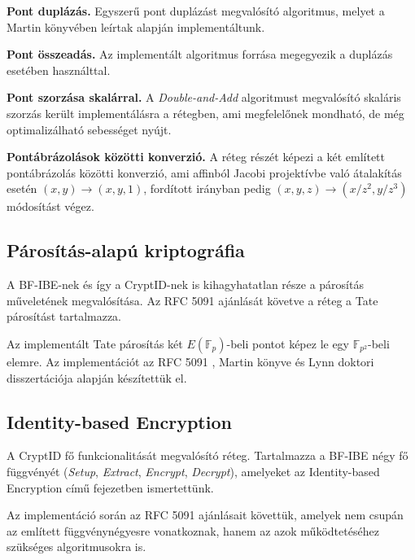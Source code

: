 \begin{outdentlist}
    \item[]\textbf{Pont duplázás.}
    Egyszerű pont duplázást megvalósító algoritmus, melyet a Martin könyvében leírtak alapján implementáltunk.
    
    \item[]\textbf{Pont összeadás.}
    Az implementált algoritmus forrása megegyezik a duplázás esetében használttal.

    \item[]\textbf{Pont szorzása skalárral.} 
    A \textit{Double-and-Add} algoritmust megvalósító skaláris szorzás került implementálásra a rétegben, ami megfelelőnek mondható, de még optimalizálható sebességet nyújt.
    
    \item[]\textbf{Pontábrázolások közötti konverzió.}
    A réteg részét képezi a két említett pontábrázolás közötti konverzió, ami affinból Jacobi projektívbe való átalakítás esetén $(x, y) \rightarrow (x, y, 1)$, fordított irányban pedig $(x, y, z) \rightarrow (x/z^2, y/z^3)$ módosítást végez.
\end{outdentlist}

\subsection{Párosítás-alapú kriptográfia}

A BF-IBE-nek és így a CryptID-nek is kihagyhatatlan része a párosítás műveletének megvalósítása. Az RFC 5091 ajánlását követve a réteg a Tate párosítást tartalmazza.

Az implementált Tate párosítás két $E(\mathbb{F}_p)$-beli pontot képez le egy $\mathbb{F}_{p^2}$-beli elemre. Az implementációt az RFC 5091 \citeyear{RFC5091}, Martin könyve \citeyear{Martin::IntroductionToIdentityBasedEncryption} és Lynn doktori disszertációja \citeyear{Lynn::PBC} alapján készítettük el.

\subsection{Identity-based Encryption}

A CryptID fő funkcionalitását megvalósító réteg. Tartalmazza a BF-IBE négy fő függvényét (\textit{Setup}, \textit{Extract}, \textit{Encrypt}, \textit{Decrypt}), amelyeket az Identity-based Encryption című fejezetben ismertettünk.

Az implementáció során az RFC 5091 ajánlásait követtük, amelyek nem csupán az említett függvénynégyesre vonatkoznak, hanem az azok működtetéséhez szükséges algoritmusokra is. 

